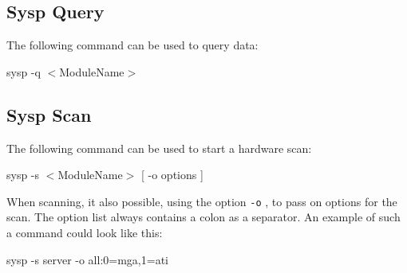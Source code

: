 \subsection{Sysp Query}
The following command can be used to query data:

\begin{Command}{8cm}
sysp -q $<$ModuleName$>$
\end{Command}

\subsection{Sysp Scan}
The following command can be used to start a hardware scan:

\begin{Command}{8cm}
sysp -s $<$ModuleName$>$ [ -o options ] 
\end{Command}

When scanning, it also possible, using the option \verb+-o+ , to pass on
options for the scan. The option list always contains a colon as a separator. 
An example of such a command could look like this:

\begin{Command}{8cm}
sysp -s server -o all:0=mga,1=ati
\end{Command}
